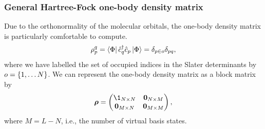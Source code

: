             \subsubsection{General Hartree-Fock one-body density matrix}
                Due to the orthonormality of the molecular orbitals, the
                one-body density matrix is particularly comfortable to compute.
                \begin{align}
                    \rho^{q}_{p}
                    = \bra{\Phi}
                    \hat{c}_{q}^{\dagger}
                    \hat{c}_{p}
                    \ket{\Phi}
                    = \delta_{p \in o}\delta_{pq},
                \end{align}
                where we have labelled the set of occupied indices in the Slater
                determinants by $o = \left\{ 1, \dots N \right\}$.
                We can represent the one-body density matrix as a block matrix
                by
                \begin{align}
                    \vfg{\densityten}
                    = \begin{pmatrix}
                        \1_{N \times N} & \vfg{0}_{N \times M} \\
                        \vfg{0}_{M \times N} & \vfg{0}_{M \times M}
                    \end{pmatrix},
                \end{align}
                where $M = L - N$, i.e., the number of virtual basis states.

